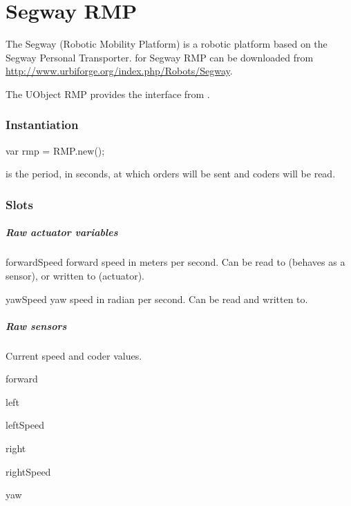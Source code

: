 
\chapter{Segway RMP}
\label{sec:segway-rmp}

The Segway  (Robotic Mobility Platform) is a robotic platform based
on the Segway Personal Transporter.  \urbi for Segway RMP can be downloaded
from \url{http://www.urbiforge.org/index.php/Robots/Segway}.

The UObject RMP provides the interface from \urbi.

\subsection{Instantiation}

\begin{urbiunchecked}
var rmp = RMP.new();
\end{urbiunchecked}

 is the period, in seconds, at which orders will be sent and
coders will be read.

\subsection{Slots}

\paragraph{Raw actuator variables}

\begin{urbiscriptapi}
\item[forwardSpeed] forward speed in meters per second.  Can be read to
  (behaves as a sensor), or written to (actuator).


\item[yawSpeed] yaw speed in radian per second.  Can be read and written
  to.
\end{urbiscriptapi}

\paragraph{Raw sensors}
Current speed and coder values.
\begin{urbiscriptapi}
\item[forward]


\item[left]


\item[leftSpeed]


\item[right]


\item[rightSpeed]


\item[yaw]
\end{urbiscriptapi}

